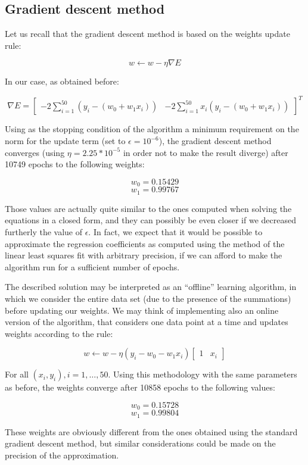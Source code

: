 \documentclass[letterpaper,headings=standardclasses]{scrartcl}
\begin{document}
\subsection{Gradient descent method}

Let us recall that the gradient descent method is based on the weights update rule:

$$ w \leftarrow w - \eta \nabla E $$

In our case, as obtained before:

$$ \nabla E = \left[ \begin{matrix} -2 \sum_{i = 1}^{50} (y_i - (w_0 + w_1 x_i)) & -2 \sum_{i = 1}^{50} x_i (y_i - (w_0 + w_1 x_i)) \end{matrix} \right]^T $$

Using as the stopping condition of the algorithm a minimum requirement on the norm for the update term (set to $\epsilon = 10^{-6}$), the gradient descent method converges (using $\eta = 2.25 * 10^{-5}$ in order not to make the result diverge) after 10749 epochs to the following weights:

$$ w_0 = 0.15429 $$
$$ w_1 = 0.99767 $$

Those values are actually quite similar to the ones computed when solving the equations in a closed form, and they can possibly be even closer if we decreased furtherly the value of $\epsilon$. In fact, we expect that it would be possible to approximate the regression coefficients as computed using the method of the linear least squares fit with arbitrary precision, if we can afford to make the algorithm run for a sufficient number of epochs.

The described solution may be interpreted as an “offline” learning algorithm, in which we consider the entire data set (due to the presence of the summations) before updating our weights. We may think of implementing also an online version of the algorithm, that considers one data point at a time and updates weights according to the rule:

$$ w \leftarrow w - \eta (y_i - w_0 - w_1 x_i) \left[ \begin{matrix} 1 & x_i \end{matrix} \right] $$

For all $(x_i,y_i), i = 1, \dots, 50$. Using this methodology with the same parameters as before, the weights converge after 10858 epochs to the following values:

$$ w_0 = 0.15728 $$
$$ w_1 = 0.99804 $$

These weights are obviously different from the ones obtained using the standard gradient descent method, but similar considerations could be made on the precision of the approximation.
\end{document}
